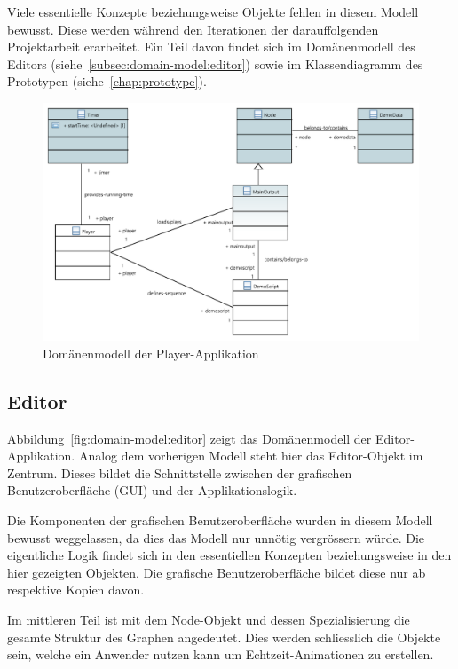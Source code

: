 Viele essentielle Konzepte beziehungsweise Objekte fehlen in diesem Modell
bewusst. Diese werden während den Iterationen der darauffolgenden Projektarbeit
erarbeitet. Ein Teil davon findet sich im Domänenmodell des Editors
(siehe~\autoref{subsec:domain-model:editor}) sowie im Klassendiagramm des Prototypen
(siehe~\autoref{chap:prototype}).

\begin{figure}[H]
    \centering
    \includegraphics{img/player_domain_model.PDF}
    \caption{Domänenmodell der
        Player-Applikation}\label{fig:domain-model:player}
\end{figure}

\subsection{Editor}
\label{subsec:domain-model:editor}

Abbildung~\ref{fig:domain-model:editor} zeigt das Domänenmodell der
Editor-Applikation. Analog dem vorherigen Modell steht hier das Editor-Objekt
im Zentrum. Dieses bildet die Schnittstelle zwischen der grafischen
Benutzeroberfläche (GUI) und der Applikationslogik.

Die Komponenten der grafischen Benutzeroberfläche wurden in diesem Modell
bewusst weggelassen, da dies das Modell nur unnötig vergrössern würde. Die
eigentliche Logik findet sich in den essentiellen Konzepten beziehungsweise in
den hier gezeigten Objekten. Die grafische Benutzeroberfläche bildet diese nur
ab respektive Kopien davon.

Im mittleren Teil ist mit dem Node-Objekt und dessen Spezialisierung die
gesamte Struktur des Graphen angedeutet. Dies werden schliesslich die Objekte
sein, welche ein Anwender nutzen kann um Echtzeit-Animationen zu erstellen.

